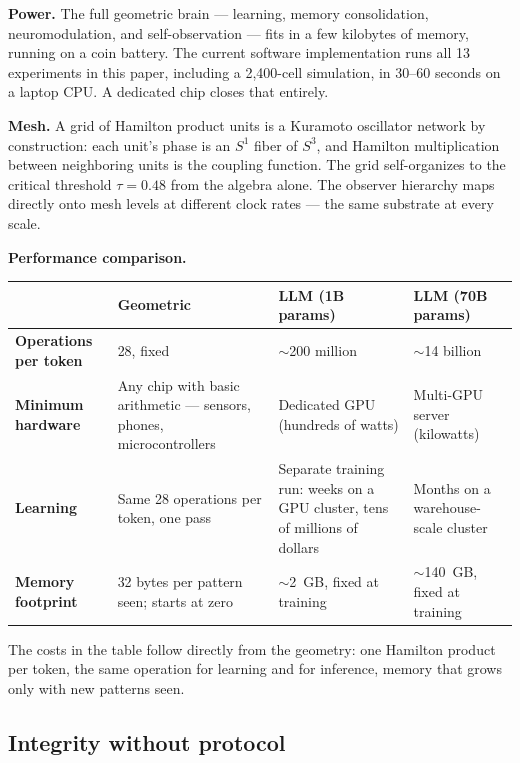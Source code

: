 \documentclass[12pt,a4paper]{article}
\theoremstyle{definition}
\theoremstyle{remark}
\begin{document}
\medskip
\noindent\textbf{Power.}
The full geometric brain --- learning, memory consolidation, neuromodulation,
and self-observation --- fits in a few kilobytes of memory, running on a coin
battery. The current software implementation runs all 13 experiments in this
paper, including a 2,400-cell simulation, in 30--60 seconds on a laptop CPU.
A dedicated chip closes that entirely.

\medskip
\noindent\textbf{Mesh.}
A grid of Hamilton product units is a Kuramoto oscillator network by
construction: each unit's phase is an $S^1$ fiber of $S^3$, and Hamilton
multiplication between neighboring units is the coupling function. The grid
self-organizes to the critical threshold $\tau = 0.48$ from the algebra
alone. The observer hierarchy maps directly onto mesh levels at different
clock rates --- the same substrate at every scale.

\medskip
\noindent\textbf{Performance comparison.}

\begin{center}
\begin{tabular}{p{3.8cm}p{3.4cm}p{3.0cm}p{3.0cm}}
\toprule
& \textbf{Geometric} & \textbf{LLM (1B params)} & \textbf{LLM (70B params)} \\
\midrule
\textbf{Operations per token} &
  28, fixed &
  ${\sim}$200 million &
  ${\sim}$14 billion \\[6pt]
\textbf{Minimum hardware} &
  Any chip with basic arithmetic --- sensors, phones, microcontrollers &
  Dedicated GPU (hundreds of watts) &
  Multi-GPU server (kilowatts) \\[6pt]
\textbf{Learning} &
  Same 28 operations per token, one pass &
  Separate training run: weeks on a GPU cluster, tens of millions of dollars &
  Months on a warehouse-scale cluster \\[6pt]
\textbf{Memory footprint} &
  32 bytes per pattern seen; starts at zero &
  ${\sim}$2~GB, fixed at training &
  ${\sim}$140~GB, fixed at training \\
\bottomrule
\end{tabular}
\end{center}

The costs in the table follow directly from the geometry: one Hamilton product
per token, the same operation for learning and for inference, memory that
grows only with new patterns seen.

\subsection{Integrity without protocol}
\end{document}
